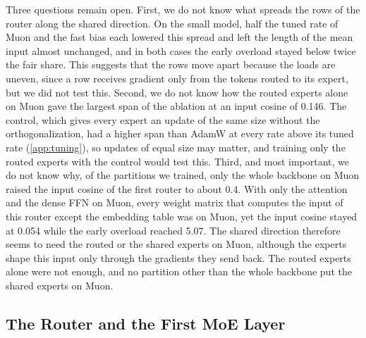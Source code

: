 \documentclass[11pt, a4paper]{article}
\begin{document}
Three questions remain open. First, we do not know what spreads the rows of the router along the shared direction. On the small model, half the tuned rate of Muon and the fast bias each lowered this spread and left the length of the mean input almost unchanged, and in both cases the early overload stayed below twice the fair share. This suggests that the rows move apart because the loads are uneven, since a row receives gradient only from the tokens routed to its expert, but we did not test this. Second, we do not know how the routed experts alone on Muon gave the largest span of the ablation at an input cosine of 0.146. The control, which gives every expert an update of the same size without the orthogonalization, had a higher span than AdamW at every rate above its tuned rate (\cref{app:tuning}), so updates of equal size may matter, and training only the routed experts with the control would test this. Third, and most important, we do not know why, of the partitions we trained, only the whole backbone on Muon raised the input cosine of the first router to about 0.4. With only the attention and the dense FFN on Muon, every weight matrix that computes the input of this router except the embedding table was on Muon, yet the input cosine stayed at 0.054 while the early overload reached 5.07. The shared direction therefore seems to need the routed or the shared experts on Muon, although the experts shape this input only through the gradients they send back. The routed experts alone were not enough, and no partition other than the whole backbone put the shared experts on Muon.

\subsection{The Router and the First MoE Layer}
\label{sec:where}
\end{document}
